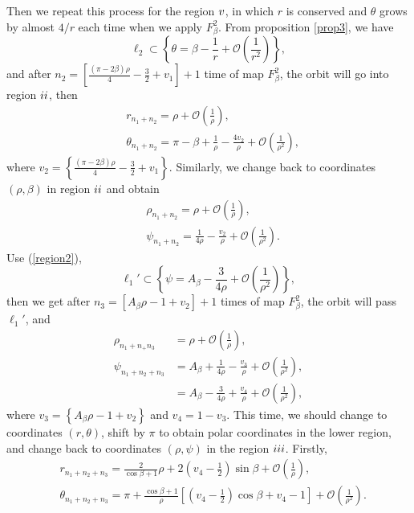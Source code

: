 \documentclass{article}
\def \Rtwo{\uppercase\expandafter{\romannumeral2}}
\def \Rthree{\uppercase\expandafter{\romannumeral3}}
\def \Rfive{\uppercase\expandafter{\romannumeral5}}
\numberwithin{figure}{section}
\numberwithin{equation}{section}
\theoremstyle{remark}
\theoremstyle{definition}
\begin{document}
Then we repeat this process for the region $\Rfive$, in which $r$ is conserved and $\theta$ grows by almost $4/r$ each time when we apply $F_\beta^2$. From proposition \ref*{prop3}, we have
$$\ell_2\subset \left\{\theta=\beta-\frac{1}{r}+\mathcal{O}\left(\frac{1}{r^2}\right)\right\},$$
and after $n_2=\left[\frac{(\pi-2\beta)\rho}{4}-\frac{3}{2}+v_1\right]+1$  time of map $F_\beta^2$, the orbit will go into region $\Rtwo$, then
\begin{equation}
	\begin{split}
		&r_{n_1+n_2}=\rho+\mathcal{O}\left(\frac{1}{\rho}\right),\\
		&\theta_{n_1+n_2}=\pi-\beta+\frac{1}{\rho}-\frac{4v_2}{\rho}+\mathcal{O}\left(\frac{1}{\rho^2}\right),
	\end{split}
\end{equation}
where $v_2=\left\{\frac{(\pi-2\beta)\rho}{4}-\frac{3}{2}+v_1\right\}$. Similarly, we change back to coordinates $(\rho,\beta)$ in region $\Rtwo$ and obtain
\begin{equation}
	\begin{split}
		&\rho_{n_1+n_2}=\rho+\mathcal{O}\left(\frac{1}{\rho}\right),\\
		&\psi_{n_1+n_2}=\frac{1}{4\rho}-\frac{v_2}{\rho}+\mathcal{O}\left(\frac{1}{\rho^2}\right).
	\end{split}
\end{equation}
Use (\ref*{region2}),
$$\ell_1' \subset\left\{\psi=A_\beta-\frac{3}{4\rho}+\mathcal{O}\left(\frac{1}{\rho^2}\right)\right\},$$
then we get after $n_3=\left[A_\beta\rho-1+v_2\right]+1$ times of map $F_\beta^2$, the orbit will pass $\ell_1'$, and 
\begin{equation}
	\begin{split}
		\rho_{n_1+n_+n_3}&=\rho+\mathcal{O}\left(\frac{1}{\rho}\right),\\
		\psi_{n_1+n_2+n_3}&=A_\beta+\frac{1}{4\rho}-\frac{v_3}{\rho}+\mathcal{O}\left(\frac{1}{\rho^2}\right),\\
		&=A_\beta-\frac{3}{4\rho}+\frac{v_4}{\rho}+\mathcal{O}\left(\frac{1}{\rho^2}\right),
	\end{split}
\end{equation}
where $v_3=\left\{A_\beta\rho-1+v_2\right\}$ and $v_4=1-v_3$. This time, we should change to coordinates $(r,\theta)$, shift by $\pi$ to obtain polar coordinates in the lower region, and change back to coordinates $(\rho,\psi)$ in the region $\Rthree$. Firstly, 
\begin{equation}
	\begin{split}
		&r_{n_1+n_2+n_3}=\frac{2}{\cos\beta+1}\rho+2\left(v_4-\frac{1}{2}\right)\sin\beta+\mathcal{O}\left(\frac{1}{\rho}\right),\\
		&\theta_{n_1+n_2+n_3}=\pi+\frac{\cos\beta+1}{\rho}\left[\left(v_4-\frac{1}{2}\right)\cos\beta+v_4-1\right]+\mathcal{O}\left(\frac{1}{\rho^2}\right).	\end{split}
\end{equation}
\end{document}
